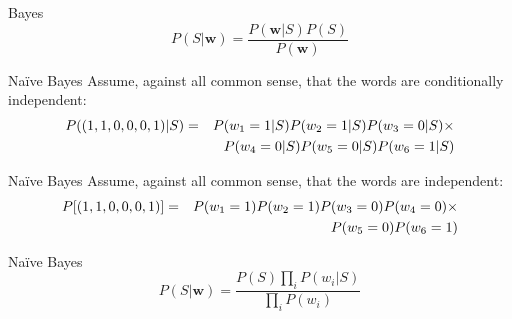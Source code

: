 \documentclass{beamer}
\newcommand{\crish}{\color{reddish}}
\newcommand{\cbla}{\color{black}}
\begin{document}
\begin{frame}{Bayes}
  \crish$$
P(S|\textbf{w})=\frac{P(\textbf{w}|S)P(S)}{P(\textbf{w})}
$$\cbla{}
\end{frame}

\begin{frame}{Na\"{i}ve Bayes}
  Assume, against all common sense, that the words are conditionally independent:
  \crish\begin{eqnarray*}
  P((1,1,0,0,0,1)|S)&=&P(w_1=1|S)P(w_2=1|S)P(w_3=0|S)\times\cr&&P(w_4=0|S)P(w_5=0|S)P(w_6=1|S)
\end{eqnarray*}\cbla{}
\end{frame}


\begin{frame}{Na\"{i}ve Bayes}
  Assume, against all common sense, that the words are independent:
  \crish\begin{eqnarray*}
    P[(1,1,0,0,0,1)]&=&P(w_1=1)P(w_2=1)P(w_3=0)P(w_4=0)\times\cr&&P(w_5=0)P(w_6=1)
\end{eqnarray*}\cbla{}
\end{frame}

\begin{frame}{Na\"{i}ve Bayes}
  \crish$$
  P(S|\textbf{w})=\frac{P(S)\prod_i P(w_i|S)}{\prod_i P(w_i)}
  $$\cbla{}
\end{frame}
\end{document}
